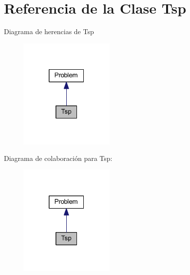 \hypertarget{class_tsp}{\section{Referencia de la Clase Tsp}
\label{class_tsp}
}


Diagrama de herencias de Tsp
\nopagebreak
\begin{figure}[H]
\begin{center}
\leavevmode
\includegraphics[width=133pt]{class_tsp__inherit__graph}
\end{center}
\end{figure}


Diagrama de colaboración para Tsp\+:
\nopagebreak
\begin{figure}[H]
\begin{center}
\leavevmode
\includegraphics[width=133pt]{class_tsp__coll__graph}
\end{center}
\end{figure}
